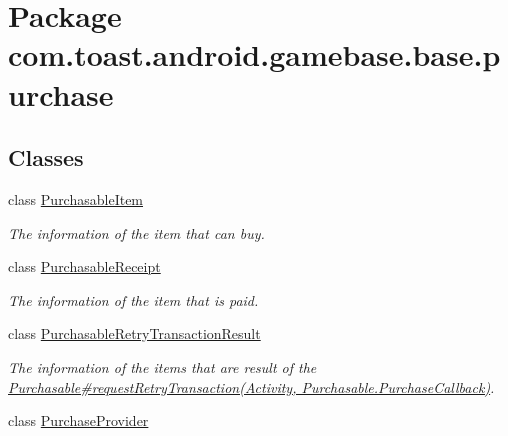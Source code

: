 \hypertarget{namespacecom_1_1toast_1_1android_1_1gamebase_1_1base_1_1purchase}{}\section{Package com.\+toast.\+android.\+gamebase.\+base.\+purchase}
\label{namespacecom_1_1toast_1_1android_1_1gamebase_1_1base_1_1purchase}
\subsection*{Classes}
\begin{DoxyCompactItemize}
\item 
class \hyperlink{classcom_1_1toast_1_1android_1_1gamebase_1_1base_1_1purchase_1_1_purchasable_item}{Purchasable\+Item}
\begin{DoxyCompactList}\small\item\em The information of the item that can buy. \end{DoxyCompactList}\item 
class \hyperlink{classcom_1_1toast_1_1android_1_1gamebase_1_1base_1_1purchase_1_1_purchasable_receipt}{Purchasable\+Receipt}
\begin{DoxyCompactList}\small\item\em The information of the item that is paid. \end{DoxyCompactList}\item 
class \hyperlink{classcom_1_1toast_1_1android_1_1gamebase_1_1base_1_1purchase_1_1_purchasable_retry_transaction_result}{Purchasable\+Retry\+Transaction\+Result}
\begin{DoxyCompactList}\small\item\em The information of the items that are result of the \hyperlink{}{Purchasable\#request\+Retry\+Transaction(\+Activity, Purchasable.\+Purchase\+Callback)}. \end{DoxyCompactList}\item 
class \hyperlink{classcom_1_1toast_1_1android_1_1gamebase_1_1base_1_1purchase_1_1_purchase_provider}{Purchase\+Provider}
\end{DoxyCompactItemize}
